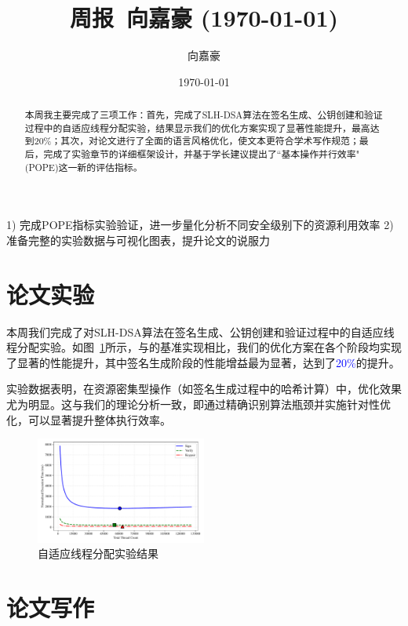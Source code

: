 \documentclass{article}
\title{周报~向嘉豪 (\today)}
\author{向嘉豪}
\date{\today}
\begin{document}
\maketitle

\begin{abstract}
  本周我主要完成了三项工作：首先，完成了SLH-DSA算法在签名生成、公钥创建和验证过程中的自适应线程分配实验，结果显示我们的优化方案实现了显著性能提升，最高达到20\%；其次，对论文进行了全面的语言风格优化，使文本更符合学术写作规范；最后，完成了实验章节的详细框架设计，并基于学长建议提出了``基本操作并行效率"(POPE)这一新的评估指标。
\end{abstract}

\begin{weekplan}
1) 完成POPE指标实验验证，进一步量化分析不同安全级别下的资源利用效率
2) 准备完整的实验数据与可视化图表，提升论文的说服力
\end{weekplan}

\section{论文实验}

本周我们完成了对SLH-DSA算法在签名生成、公钥创建和验证过程中的自适应线程分配实验。如图~\ref{fig:expriment}所示，与\cite{Wang2025}的基准实现相比，我们的优化方案在各个阶段均实现了显著的性能提升，其中签名生成阶段的性能增益最为显著，达到了\textcolor{blue}{20\%}的提升。

实验数据表明，在资源密集型操作（如签名生成过程中的哈希计算）中，优化效果尤为明显。这与我们的理论分析一致，即通过精确识别算法瓶颈并实施针对性优化，可以显著提升整体执行效率。

\begin{figure}[htbp]
\centering
\includegraphics[width=0.5\textwidth]{./fig/thread_efficiency.pdf}
\caption{自适应线程分配实验结果}
\label{fig:expriment}
\end{figure}

\section{论文写作}
\end{document}
